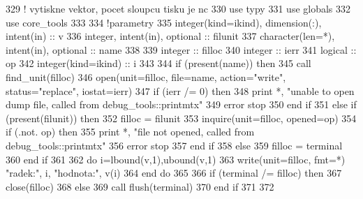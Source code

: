 \begin{DoxyCode}
329     \textcolor{comment}{! vytiskne vektor, pocet sloupcu tisku je nc}
330       \textcolor{keywordtype}{use }typy
331       \textcolor{keywordtype}{use }globals
332       \textcolor{keywordtype}{use }core_tools
333       
334       \textcolor{comment}{!parametry}
335       \textcolor{keywordtype}{integer(kind=ikind)}, \textcolor{keywordtype}{dimension(:)}, \textcolor{keywordtype}{intent(in)} :: v
336       \textcolor{keywordtype}{integer}, \textcolor{keywordtype}{intent(in)}, \textcolor{keywordtype}{optional} :: filunit   
337       \textcolor{keywordtype}{character(len=*)}, \textcolor{keywordtype}{intent(in)}, \textcolor{keywordtype}{optional} :: name
338 
339       \textcolor{keywordtype}{integer} :: filloc
340       \textcolor{keywordtype}{integer} :: ierr
341       \textcolor{keywordtype}{logical} :: op
342       \textcolor{keywordtype}{integer(kind=ikind)} :: i
343       
344       \textcolor{keywordflow}{if} (\textcolor{keyword}{present}(name)) \textcolor{keywordflow}{then}
345         \textcolor{keyword}{call }find_unit(filloc)
346         \textcolor{keyword}{open}(unit=filloc, file=name, action=\textcolor{stringliteral}{"write"}, status=\textcolor{stringliteral}{"replace"}, iostat=ierr)
347         \textcolor{keywordflow}{if} (ierr /= 0) \textcolor{keywordflow}{then}
348           print *, \textcolor{stringliteral}{"unable to open dump file, called from debug\_tools::printmtx"}
349           error stop
350 \textcolor{keywordflow}{        end if}
351       \textcolor{keywordflow}{else} \textcolor{keywordflow}{if} (\textcolor{keyword}{present}(filunit)) \textcolor{keywordflow}{then}
352         filloc = filunit
353         \textcolor{keyword}{inquire}(unit=filloc, opened=op)
354         \textcolor{keywordflow}{if} (.not. op) \textcolor{keywordflow}{then}
355           print *, \textcolor{stringliteral}{"file not opened, called from debug\_tools::printmtx"}
356           error stop
357 \textcolor{keywordflow}{        end if}
358       \textcolor{keywordflow}{else}
359         filloc = terminal
360 \textcolor{keywordflow}{      end if}
361 
362       \textcolor{keywordflow}{do} i=lbound(v,1),ubound(v,1)
363          \textcolor{keyword}{write}(unit=filloc, fmt=*) \textcolor{stringliteral}{"radek:"}, i, \textcolor{stringliteral}{"hodnota:"}, v(i)
364 \textcolor{keywordflow}{      end do}
365   
366       \textcolor{keywordflow}{if} (terminal /= filloc) \textcolor{keywordflow}{then}
367         \textcolor{keyword}{close}(filloc)
368       \textcolor{keywordflow}{else}
369         \textcolor{keyword}{call }flush(terminal)
370 \textcolor{keywordflow}{      end if}
371   
372 
\end{DoxyCode}


